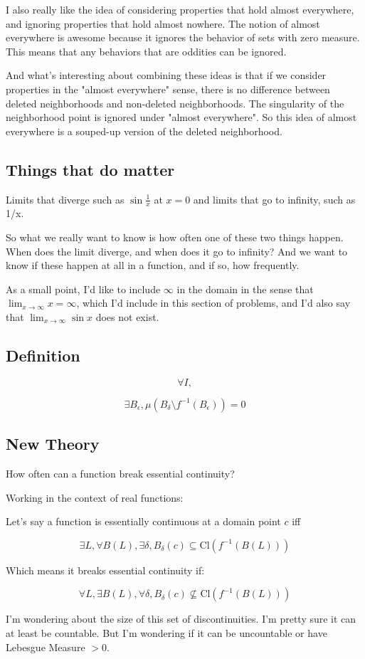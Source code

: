 \documentclass{article}
\begin{document}
I also really like the idea of considering properties that hold almost everywhere, and ignoring properties that hold almost nowhere. The notion of almost everywhere is awesome because it ignores the behavior of sets with zero measure. This means that any behaviors that are oddities can be ignored. 

And what's interesting about combining these ideas is that if we consider properties in the "almost everywhere" sense, there is no difference between deleted neighborhoods and non-deleted neighborhoods. The singularity of the neighborhood point is ignored under "almost everywhere".  So this idea of almost everywhere is a souped-up version of the deleted neighborhood.

\subsection{Things that do matter}
Limits that diverge such as $\sin \frac{1}{x}$ at $x=0$ and limits that go to infinity, such as 1/x. 

So what we really want to know is how often one of these two things happen. When does the limit diverge, and when does it go to infinity? And we want to know if these happen at all in a function, and if so, how frequently. 

As a small point, I'd like to include $\infty$ in the domain in the sense that $\displaystyle \lim_{x \to \infty} x = \infty$, which I'd include in this section of problems, and I'd also say that $\displaystyle \lim_{x \to \infty} \sin x$ does not exist.  

\subsection{Definition}

$$\forall I, $$

$$\exists B_{\epsilon} , \mu(B_{\delta} \setminus f^{-1}(B_\epsilon)) = 0$$

\subsection{New Theory}

How often can a function break essential continuity?

Working in the context of real functions:

Let's say a function is essentially continuous at a domain point $c$ iff

$$\exists L, \forall B(L), \exists \delta, B_\delta (c) \subseteq \textrm{Cl}(f^{-1}(B(L)))$$

Which means it breaks essential continuity if: 

$$\forall L, \exists B(L), \forall \delta, B_\delta (c) \nsubseteq  \textrm{Cl}(f^{-1}(B(L)))$$

I'm wondering about the size of this set of discontinuities. I'm pretty sure it can at least be countable. But I'm wondering if it can be uncountable or have Lebesgue Measure $> 0$.
\end{document}
